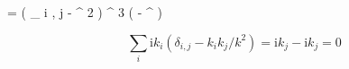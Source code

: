 \be\label{eq1.4.17}
 =  \hbar \left( \delta _ { i , j } -  { \nabla ^ { 2 } } \right) \delta ^ { 3 } \left(  -  ^ { \prime } \right)
\ee

\[\sum _ { i } \mathrm { i } k _ { i } \left( \delta _ { i , j } - k _ { i } k _ { j } / k ^ { 2 } \right) = \mathrm { i } k _ { j } - \mathrm { i } k _ { j } = 0 \]


















